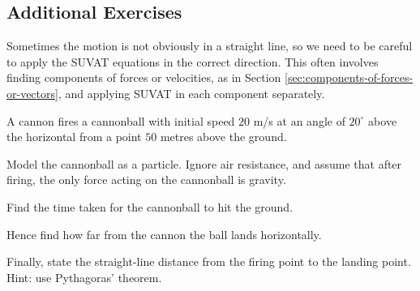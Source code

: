 \subsection{Additional Exercises}\label{sec:kinematics_additional_exercises}

Sometimes the motion is not obviously in a straight line, so we need to be careful to apply the SUVAT equations in the correct direction. This often involves finding components of forces or velocities, as in Section \ref{sec:components-of-forces-or-vectors}, and applying SUVAT in each component separately.

\begin{example}
A cannon fires a cannonball with initial speed $20$ m/s at an angle of $20^\circ$ above the horizontal from a point $50$ metres above the ground.

Model the cannonball as a particle. Ignore air resistance, and assume that after firing, the only force acting on the cannonball is gravity.

Find the time taken for the cannonball to hit the ground.

Hence find how far from the cannon the ball lands horizontally.

Finally, state the straight-line distance from the firing point to the landing point. Hint: use Pythagoras' theorem.

\end{example}

